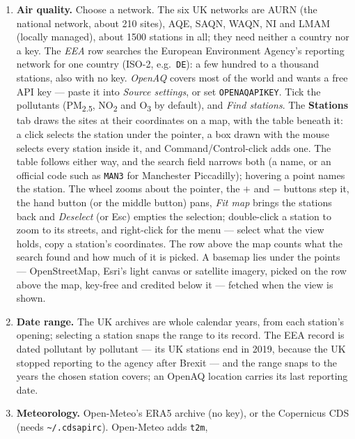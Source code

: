 \documentclass[11pt]{report}
\newcommand{\nosep}{\setlength{\itemsep}{0pt}\setlength{\parskip}{0pt}\setlength{\topsep}{2pt}}
\newcommand{\codeunderscore}{\textunderscore\allowbreak}
\newcommand{\code}[1]{\texttt{\let\_\codeunderscore #1}}
\newcommand{\tab}[1]{\textbf{#1}}
\newcommand{\NOtwo}{NO\textsubscript{2}}
\newcommand{\PMtwo}{PM\textsubscript{2.5}}
\begin{document}
\begin{enumerate}\nosep
  \item \textbf{Air quality.} Choose a network. The six UK networks are AURN (the
        national network, about 210 sites), AQE, SAQN, WAQN, NI and LMAM (locally
        managed), about 1500 stations in all; they need neither a country nor a key.
        The \emph{EEA} row searches the European Environment Agency's reporting
        network for one country (ISO-2, e.g.\ \code{DE}): a few hundred to a thousand
        stations, also with no key. \emph{OpenAQ} covers most of the world and wants
        a free API key --- paste it into \emph{Source settings}, or set
        \code{OPENAQ\_API\_KEY}. Tick the pollutants (\PMtwo{}, \NOtwo{} and
        O\textsubscript{3} by default), and \emph{Find stations}. The \tab{Stations}
        tab draws the sites at their coordinates on a map, with the table beneath
        it: a click selects the station under the pointer, a box drawn with the
        mouse selects every station inside it, and Command/Control-click adds
        one. The table follows either way, and the search field narrows both (a
        name, or an official code such as \code{MAN3} for Manchester
        Piccadilly); hovering a point names the station. The wheel zooms about
        the pointer, the $+$ and $-$ buttons step it, the hand button (or the
        middle button) pans, \emph{Fit map} brings the stations back and
        \emph{Deselect} (or Esc) empties the selection; double-click a station
        to zoom to its streets, and right-click for the menu --- select what the
        view holds, copy a station's coordinates. The row above the map counts
        what the search found and how much of it is picked. A basemap lies under the points
        --- OpenStreetMap, Esri's light canvas or satellite imagery, picked on
        the row above the map, key-free and credited below it --- fetched when
        the view is shown.
  \item \textbf{Date range.} The UK archives are whole calendar years, from each
        station's opening; selecting a station snaps the range to its record. The EEA
        record is dated pollutant by pollutant --- its UK stations end in 2019,
        because the UK stopped reporting to the agency after Brexit --- and the range
        snaps to the years the chosen station covers; an OpenAQ location carries its
        last reporting date.
  \item \textbf{Meteorology.} Open-Meteo's ERA5 archive (no key), or the Copernicus CDS
        (needs \code{\textasciitilde/.cdsapirc}). Open-Meteo adds \code{t2m},

\end{enumerate}
\end{document}
